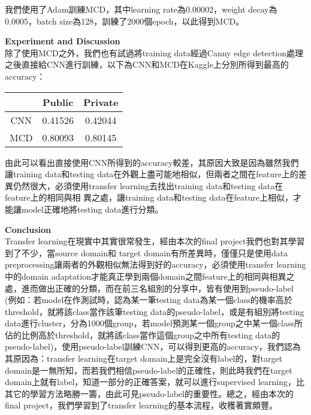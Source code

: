 \documentclass{article}
\begin{document}
我們使用了Adam訓練MCD，其中learning rate為0.00002，weight decay為0.0005，batch size為128，訓練了2000個epoch，以此得到MCD。\\

\bigskip

\noindent
{\bf \LARGE Experiment and Discussion}\\

除了使用MCD之外，我們也有試過將training data經過Canny edge detection處理之後直接給CNN進行訓練，以下為CNN和MCD在Kaggle上分別所得到最高的accuracy：

\begin{center}
    \begin{tabular}{|c|c|c|}
        \hline
        & Public & Private\\
        \hline
        CNN & 0.41526 & 0.42044\\
        \hline
        MCD & 0.80093 & 0.80145\\
        \hline
    \end{tabular}
\end{center}

由此可以看出直接使用CNN所得到的accuracy較差，其原因大致是因為雖然我們讓training data和testing data在外觀上盡可能地相似，但兩者之間在feature上的差異仍然很大，必須使用transfer learning去找出training data和testing data在feature上的相同與相
異之處，讓training data和testing data在feature上相似，才能讓model正確地將testing data進行分類。\\

\bigskip

\noindent
{\bf \LARGE Conclusion}\\

Transfer learning在現實中其實很常發生，經由本次的final project我們也對其學習到了不少，當source domain和
target domain有所差異時，僅僅只是使用data preprocessing讓兩者的外觀相似無法得到好的accuracy，必須使用transfer learning中的domain adaptation才能真正學到兩個domain之間feature上的相同與相異之處，進而做出正確的分類，而在前三名組別的分享中，皆有使用到pseudo-label (例如：若model在作測試時，認為某一筆testing data為某一個class的機率高於threshold，就將該class當作該筆testing data的pseudo-label，或是有組別將testing data進行cluster，分為1000個group，若model預測某一個group之中某一個class所佔的比例高於threshold，就將該class當作這個group之中所有testing data的pseudo-label)，使用pseudo-label訓練CNN，可以得到更高的accuracy，我們認為其原因為：transfer learning在target domain上是完全沒有label的，對target domain是一無所知，而若我們相信pseudo-label的正確性，則此時我們在target domain上就有label，知道一部分的正確答案，就可以進行supervised learning，比其它的學習方法略勝一籌，由此可見pseudo-label的重要性。總之，經由本次的final project，我們學習到了transfer learning的基本流程，收穫著實頗豐。
\end{document}
